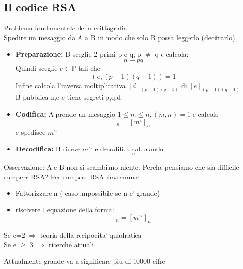\documentclass{article}
\begin{document}
     \subsection{Il codice RSA}
     \begin{flushleft}
      Problema fondamentale della crittografia: \\ 
       Spedire un mesaggio da  A a B in modo che solo B possa leggerlo (decifrarlo).
     \end{flushleft}
     \begin{itemize}
       \item \textbf{Preparazione:} B sceglie 2 primi p e q, p $\neq$ q e calcola:
         \begin{equation}
          n=pq
         \end{equation}
         Quindi sceglie $e \in \mathbb{P}$ tali che 
         \begin{equation}
           (e,(p-1)(q-1))=1
         \end{equation}
         Infine calcola l'inversa moltiplicativa $[d]_{(p-1)(q-1)}$ di $[e]_{(p-1)(q-1)}$\\ 
         B pubblica n,e  e tiene segreti p,q,d
       \item \textbf{Codifica:} A prende un mesaggio $1 \leq m \leq n,(m,n)=1$ e calcola
         \begin{equation}
           [m^{\sim}]_n=[m^e]_n
         \end{equation}
         e spedisce $m^{\sim}$
       \item \textbf{Decodifica:} B riceve $m^{\sim}$ e decodifica calcolando
         \begin{equation}
           [m^{\sim d}]_n
         \end{equation}
     \end{itemize}
     \begin{flushleft}
       Osservazione: A e B non si scambiano niente. Perche pensiamo che sia difficile rompere RSA? Per rompere RSA dovremmo:
     \end{flushleft}
     \begin{itemize}
       \item Fattorizzare n ( caso impossibile se n e' grande)
       \item risolvere l equazione della forma:
         \begin{equation}
           [x^e]_n=[m^{\sim}]_n
         \end{equation}
     \end{itemize}
     \begin{flushleft}
      Se e=2 $\Rightarrow$ teoria della recipocita' quadratica \\ 
       Se e $\geq$ 3 $\Rightarrow$ ricerche attuali
     \end{flushleft}
     \begin{flushleft}
      Attualmente grande va a significare piu di 10000 cifre
     \end{flushleft}
\end{document}
